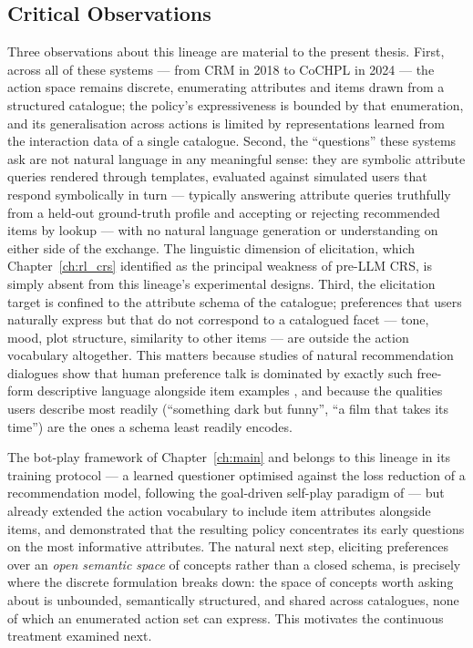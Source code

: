 \subsection{Critical Observations}

Three observations about this lineage are material to the present thesis. First, across all of these systems — from CRM in 2018 to CoCHPL in 2024 — the action space remains discrete, enumerating attributes and items drawn from a structured catalogue; the policy's expressiveness is bounded by that enumeration, and its generalisation across actions is limited by representations learned from the interaction data of a single catalogue. Second, the ``questions'' these systems ask are not natural language in any meaningful sense: they are symbolic attribute queries rendered through templates, evaluated against simulated users that respond symbolically in turn — typically answering attribute queries truthfully from a held-out ground-truth profile and accepting or rejecting recommended items by lookup — with no natural language generation or understanding on either side of the exchange. The linguistic dimension of elicitation, which Chapter~\ref{ch:rl_crs} identified as the principal weakness of pre-LLM CRS, is simply absent from this lineage's experimental designs. Third, the elicitation target is confined to the attribute schema of the catalogue; preferences that users naturally express but that do not correspond to a catalogued facet — tone, mood, plot structure, similarity to other items — are outside the action vocabulary altogether. This matters because studies of natural recommendation dialogues show that human preference talk is dominated by exactly such free-form descriptive language alongside item examples \citep{radlinski2019coached}, and because the qualities users describe most readily (``something dark but funny'', ``a film that takes its time'') are the ones a schema least readily encodes.

The bot-play framework of Chapter~\ref{ch:main} and \citet{makarova2024learning} belongs to this lineage in its training protocol — a learned questioner optimised against the loss reduction of a recommendation model, following the goal-driven self-play paradigm of \citet{das2017learning} — but already extended the action vocabulary to include item attributes alongside items, and demonstrated that the resulting policy concentrates its early questions on the most informative attributes. The natural next step, eliciting preferences over an \textit{open semantic space} of concepts rather than a closed schema, is precisely where the discrete formulation breaks down: the space of concepts worth asking about is unbounded, semantically structured, and shared across catalogues, none of which an enumerated action set can express. This motivates the continuous treatment examined next.

